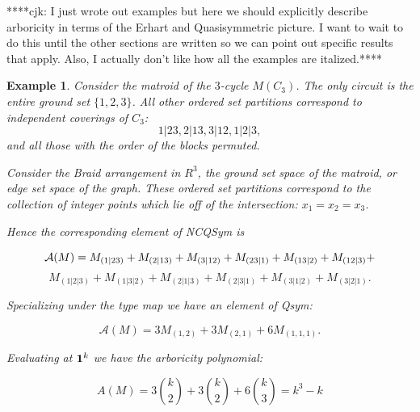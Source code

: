 \documentclass[12pt]{amsart}
\newtheorem{example}[definition]{Example}
\begin{document}



****cjk: I just wrote out examples but here we should explicitly describe arboricity in terms of the Erhart and Quasisymmetric picture.  I want to wait to do this until the other sections are written so we can point out specific results that apply.  Also, I actually don't like how all the examples are italized.****


\begin{example}

Consider the matroid of the $3$-cycle $M(C_3)$.  The only circuit is the entire ground set $\{1,2,3\}$.  All other ordered set partitions correspond to independent coverings of $C_3$: 
$$1|23, 2|13, 3|12, 1|2|3,$$
and all those with the order of the blocks permuted. 

Consider the Braid arrangement in $R^3$, the ground set space of the
matroid, or edge set space of the graph.  These ordered set partitions
correspond to the collection of integer points which lie off of the
intersection: $x_1 = x_2 = x_3$.


 Hence the corresponding element of NCQSym is 

$${\bf{{\mathcal A}}}(M) = M_{(1|23)} + M_{(2|13)} + M_{(3|12)} + M_{(23|1)} + M_{(13|2)} +  M_{(12|3)} + $$ $$ M_{(1|2|3)} + M_{(1|3|2)}
+ M_{(2|1|3)} + M_{(2|3|1)} + M_{(3|1|2)} + M_{(3|2|1)}. $$

\noindent Specializing under the type map we have an element of Qsym:

$${\mathcal A}(M) = 3 M_{(1,2)} + 3 M_{(2,1)} + 6 M_{(1,1,1)}. $$

\noindent Evaluating at ${\bf 1}^k $ we have the arboricity polynomial:

$$ A(M) = 3 { k \choose 2} + 3 { k \choose 2} + 6 { k \choose 3} = k^3 - k $$

\end{example}



 

 
\end{document}
